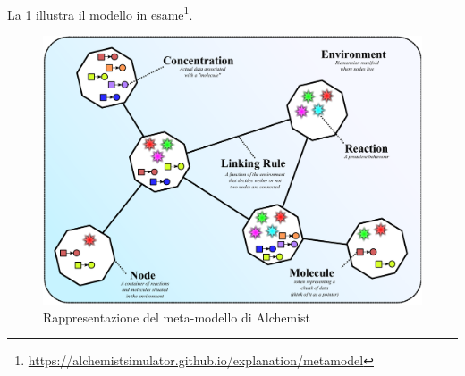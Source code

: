 La \cref{fig:alchemist-model} illustra il modello in esame\footnote{\url{https://alchemistsimulator.github.io/explanation/metamodel}}.

\begin{figure}
	\centering
	\includegraphics[width=.85\linewidth]{imgs/alchemist_meta_model.pdf}
	\caption{Rappresentazione del meta-modello di Alchemist}
	\label{fig:alchemist-model}
\end{figure}

